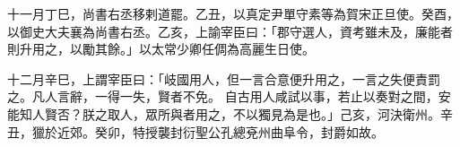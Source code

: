 \begin{pinyinscope}
 十一月丁巳，尚書右丞移剌道罷。乙丑，以真定尹單守素等為賀宋正旦使。癸酉，以御史大夫襄為尚書右丞。乙亥，上諭宰臣曰：「郡守選人，資考雖未及，廉能者則升用之，以勵其餘。」以太常少卿任倜為高麗生日使。



 十二月辛巳，上謂宰臣曰：「岐國用人，但一言合意便升用之，一言之失便責罰之。凡人言辭，一得一失，賢者不免。
 自古用人咸試以事，若止以奏對之間，安能知人賢否？朕之取人，眾所與者用之，不以獨見為是也。」己亥，河決衛州。辛丑，獵於近郊。癸卯，特授襲封衍聖公孔總兗州曲阜令，封爵如故。



\end{pinyinscope}